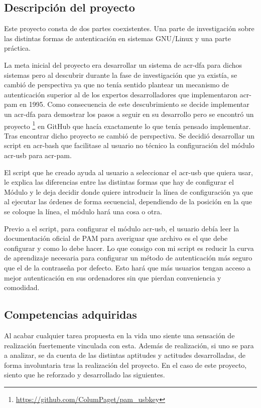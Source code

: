 \documentclass[twoside, titlepage, 12pt, a4paper]{article}
\begin{document}
\subsection{Descripción del proyecto}
Este proyecto consta de dos partes coexistentes. Una parte de investigación sobre las distintas formas de autenticación en sistemas \gls{GNU/Linux} y una parte práctica.\par
La meta inicial del proyecto era desarrollar un sistema de \gls{acr-dfa} para dichos sistemas pero al descubrir durante la fase de investigación que ya existía, se cambió de perspectiva ya que no tenía sentido plantear un mecanismo de autenticación superior al de los expertos desarrolladores que implementaron \gls{acr-pam} en 1995. Como consecuencia de este descubrimiento se decide implementar un \gls{acr-dfa} para demostrar los pasos a seguir en su desarrollo pero se encontró un proyecto \footnote{\url{https://github.com/ColumPaget/pam_usbkey}} en \gls{GitHub} que hacía exactamente lo que tenía pensado implementar. Tras encontrar dicho proyecto se cambió de perspectiva. Se decidió desarrollar un \gls{script} en \gls{acr-bash} que facilitase al usuario no técnico la configuración del módulo \gls{acr-usb} para \gls{acr-pam}.\par
El \gls{script} que he creado ayuda al usuario a seleccionar el \gls{acr-usb} que quiera usar, le explica las diferencias entre las distintas formas que hay de configurar el Módulo y le deja decidir donde quiere introducir la línea de configuración ya que al ejecutar las órdenes de forma secuencial, dependiendo de la posición en la que se coloque la línea, el módulo hará una cosa o otra. \par
Previo a el \gls{script}, para configurar el módulo \gls{acr-usb}, el usuario debía leer la documentación oficial de PAM para averiguar que archivo es el que debe configurar y como lo debe hacer. Lo que consigo con mi \gls{script} es reducir la curva de aprendizaje necesaria para configurar un método de autenticación más seguro que el de la contraseña por defecto. Esto hará que más usuarios tengan acceso a mejor autenticación en sus ordenadores sin que pierdan conveniencia y comodidad.
\subsection{Competencias adquiridas}
Al acabar cualquier tarea propuesta en la vida uno siente una sensación de realización fuertemente vinculada con esta. Además de realización, si uno se para a analizar, se da cuenta de las distintas aptitudes y actitudes desarrolladas, de forma involuntaria tras la realización del proyecto. En el caso de este proyecto, siento que he reforzado y desarrollado las siguientes.
\end{document}
